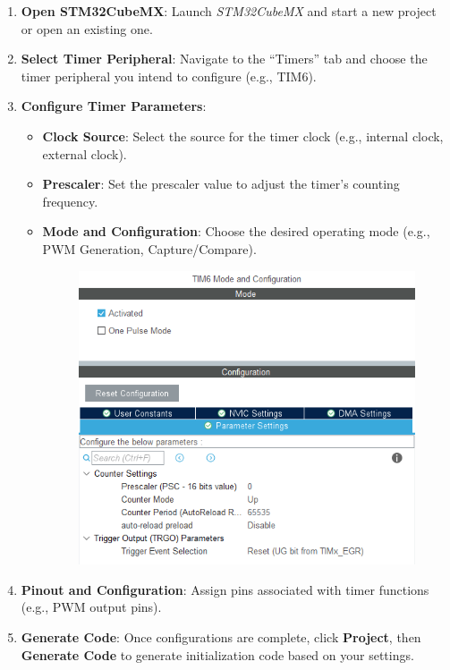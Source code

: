 \documentclass[10pt,a4paper,onecolumn]{article}
\providecommand{\tightlist}{%
  \setlength{\itemsep}{0pt}\setlength{\parskip}{0pt}}
\begin{document}
\begin{enumerate}
\def\labelenumi{\arabic{enumi}.}
\item
  \textbf{Open STM32CubeMX}: Launch \textit{STM32CubeMX} and start a new project
  or open an existing one.
\item
  \textbf{Select Timer Peripheral}: Navigate to the ``Timers'' tab and
  choose the timer peripheral you intend to configure (e.g., TIM6).
\item
  \textbf{Configure Timer Parameters}:

  \begin{itemize}
  \tightlist
  \item
    \textbf{Clock Source}: Select the source for the timer clock (e.g.,
    internal clock, external clock).
  \item
    \textbf{Prescaler}: Set the prescaler value to adjust the timer's
    counting frequency.
  \item
    \textbf{Mode and Configuration}: Choose the desired operating mode
    (e.g., PWM Generation, Capture/Compare).

    \begin{figure}[H]
      \begin{center}
        \includegraphics[width=\dimexpr\textwidth-1cm\relax,height=\dimexpr0.25\textheight-1cm\relax,keepaspectratio]{images/56.png}
      \end{center}
    \end{figure}
  \end{itemize}
\item
  \textbf{Pinout and Configuration}: Assign pins associated with timer
  functions (e.g., PWM output pins).
\item
  \textbf{Generate Code}: Once configurations are complete, click
  \textbf{Project}, then \textbf{Generate Code} to generate initialization code
  based on your settings.
\end{enumerate}
\end{document}
